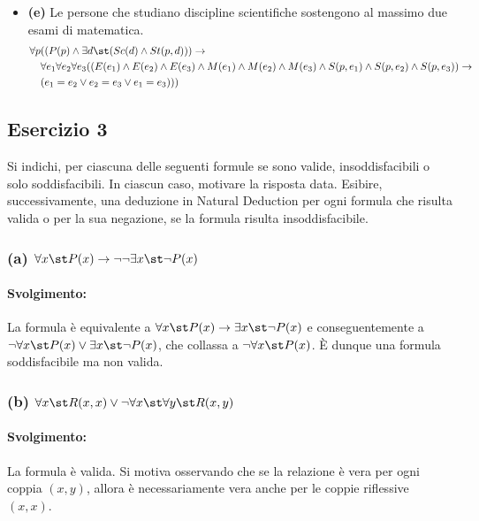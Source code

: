 \begin{itemize}
  \item \textbf{(e)} Le persone che studiano discipline scientifiche sostengono al massimo due esami di matematica.
  \[
  \begin{aligned}
    \forall p &((P(p) \wedge \exists d\st (Sc(d) \wedge St(p,d))) \rightarrow \\
    &\forall e_1 \forall e_2 \forall e_3 ((E(e_1) \wedge E(e_2) \wedge E(e_3) \wedge M(e_1) \wedge M(e_2) \wedge M(e_3) \wedge S(p,e_1) \wedge S(p,e_2) \wedge S(p,e_3)) \rightarrow\\
    & (e_1=e_2 \vee e_2=e_3 \vee e_1=e_3)))
  \end{aligned}
  \]
\end{itemize}



\subsection*{Esercizio 3}


Si indichi, per ciascuna delle seguenti formule se sono valide, insoddisfacibili o solo soddisfacibili. In ciascun caso, motivare la risposta data. Esibire, successivamente, una deduzione in Natural Deduction per ogni formula che risulta valida o per la sua negazione, se la formula risulta insoddisfacibile.


\subsubsection*{(a) \(\forall x\st P(x)\rightarrow\neg\neg\exists x\st \neg P(x)\)}
\paragraph{Svolgimento:}
La formula è equivalente a \(\forall x\st P(x) \rightarrow \exists x\st \neg P(x)\) e conseguentemente a \(\neg\forall x\st P(x) \vee \exists x\st \neg P(x)\), che collassa a \(\neg\forall x\st P(x)\). È dunque una formula soddisfacibile ma non valida.

\subsubsection*{(b) \(\forall x\st R(x,x)\vee\neg\forall x\st \forall y\st R(x,y)\)}
\paragraph{Svolgimento:}
La formula è valida. Si motiva osservando che se la relazione è vera per ogni coppia \((x,y)\), allora è necessariamente vera anche per le coppie riflessive \((x,x)\).


